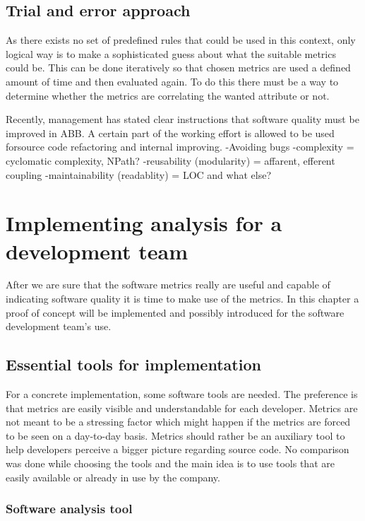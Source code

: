 \section{Trial and error approach}
As there exists no set of predefined rules that could be used in this context, only logical way is to make a sophisticated guess about what the suitable metrics could be. This can be done iteratively so that chosen metrics are used a defined amount of time and then evaluated again. To do this there must be a way to determine whether the metrics are correlating the wanted attribute or not.

Recently, management has stated clear instructions that software quality must be improved in ABB. A certain part of the working effort is allowed to be used forsource code refactoring and internal improving.
-Avoiding bugs 
-complexity = cyclomatic complexity, NPath?
-reusability (modularity) = affarent, efferent coupling
-maintainability (readablity) = LOC and what else?




\chapter{Implementing analysis for a development team}

After we are sure that the software metrics really are useful and capable of indicating software quality it is time to make use of the metrics. In this chapter a proof of concept will be implemented and possibly introduced for the software development team's use.

\section{Essential tools for implementation}

For a concrete implementation, some software tools are needed. The preference is that metrics are easily visible and understandable for each developer. Metrics are not meant to be a stressing factor which might happen if the metrics are forced to be seen on a day-to-day basis. Metrics should rather be an auxiliary tool to help developers perceive a bigger picture regarding source code. No comparison was done while choosing the tools and the main idea is to use tools that are easily available or already in use by the company.

\subsection{Software analysis tool}

